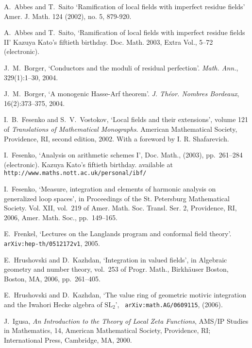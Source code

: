 \documentclass{lmsMODIFIED}
\begin{document}
\begin{thebibliography}{9}
{\sc A.~Abbes and T.~Saito} {`Ramification of local fields with imperfect residue fields'}
 Amer. J. Math.  124  (2002),  no. 5, 879-920.

{\sc A.~Abbes and T.~Saito}, {`Ramification of local fields with imperfect residue fields {I}{I}'}
Kazuya Kato's fiftieth birthday. Doc. Math.  2003,  Extra Vol., 5--72 (electronic).

{\sc J.~M.~Borger}, {`Conductors and the moduli of residual perfection'}. {\em Math. Ann.}, 329(1):1--30, 2004.

{\sc J.~M.~Borger}, {`A monogenic {H}asse-{A}rf theorem'}. {\em J. Th\'eor. Nombres Bordeaux}, 16(2):373--375, 2004.

{\sc I.~B.~Fesenko and S.~V.~Vostokov}, {`Local fields and their extensions'}, volume 121 of {\em
  Translations of Mathematical Monographs}. American Mathematical Society, Providence, RI, second edition, 2002. With a foreword by I. R. Shafarevich.

{\sc I.~Fesenko}, {`Analysis on arithmetic schemes {I}'}, Doc. Math.,
  (2003), pp.~261--284 (electronic).
\newblock Kazuya Kato's fiftieth birthday.
\newblock available at {\tt http://www.maths.nott.ac.uk/personal/ibf/}

{\sc I.~Fesenko}, {`Measure, integration and elements of harmonic analysis
  on generalized loop spaces'}, in Proceedings of the St. Petersburg
  Mathematical Society. Vol. XII, vol.~219 of Amer. Math. Soc. Transl. Ser. 2,
  Providence, RI, 2006, Amer. Math. Soc., pp.~149--165.

{\sc E.~Frenkel}, {`Lectures on the Langlands program and conformal field theory'.} {\tt arXiv:hep-th/0512172v1}, 2005.

{\sc E.~Hrushovski and D.~Kazhdan}, {`Integration in valued fields'}, in
  Algebraic geometry and number theory, vol.~253 of Progr. Math., Birkh\"auser
  Boston, Boston, MA, 2006, pp.~261--405.

{\sc E.~Hrushovski and D.~Kazhdan}, {`The value ring of geometric motivic
  integration and the {I}wahori {H}ecke algebra of $\mbox{SL}_2$'}, {\tt
  arXiv:math.AG/0609115},  (2006).

{\sc J.~Igusa}, {\em An Introduction to the Theory of Local Zeta Functions}, AMS/IP Studies in Mathematics, 14, American Mathematical Society, Providence, RI; International Press, Cambridge, MA, 2000.


\end{thebibliography}
\end{document}
